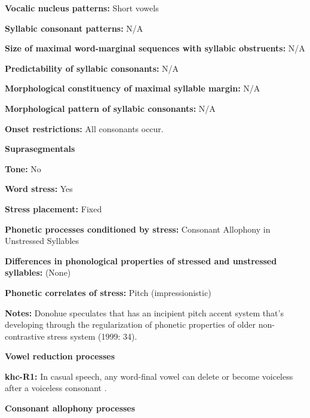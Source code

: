 \textbf{Vocalic nucleus patterns:} Short vowels



\textbf{Syllabic consonant patterns:} N/A



\textbf{Size of maximal word{}-marginal sequences with syllabic obstruents:} N/A



\textbf{Predictability of syllabic consonants:} N/A



\textbf{Morphological constituency of maximal syllable margin:} N/A



\textbf{Morphological pattern of syllabic consonants:} N/A



\textbf{Onset restrictions:} All consonants occur.



\textbf{Suprasegmentals}



\textbf{Tone:} No



\textbf{Word stress:} Yes



\textbf{Stress placement:} Fixed



\textbf{Phonetic processes conditioned by stress:} Consonant Allophony in Unstressed Syllables



\textbf{Differences in phonological properties of stressed and unstressed syllables:} (None)



\textbf{Phonetic correlates of stress:} Pitch (impressionistic)



\textbf{Notes:} Donohue speculates that  has an incipient pitch accent system that’s developing through the regularization of phonetic properties of older non-contrastive stress system (1999: 34).



\textbf{Vowel reduction processes}



\textbf{khc-R1:} In casual speech, any word-final vowel can delete or become voiceless after a voiceless consonant \citep[23]{Donohue1999}.



\textbf{Consonant allophony processes}



